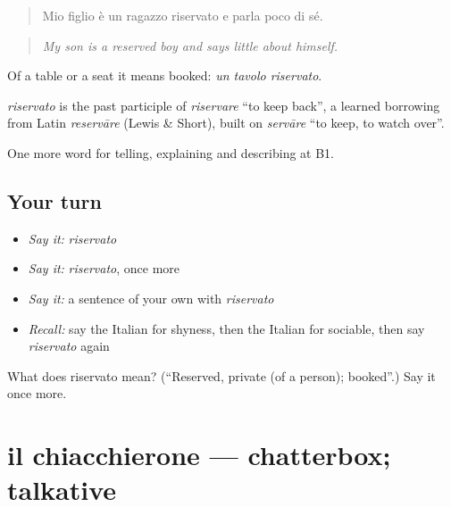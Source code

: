 \begin{quote}
Mio figlio è un ragazzo riservato e parla poco di sé.
\end{quote}

\begin{quote}
\emph{My son is a reserved boy and says little about himself.}
\end{quote}

Of a table or a seat it means booked: \emph{un tavolo riservato}.

\begin{cousinweb}
\emph{riservato} is the past participle of \emph{riservare} \textquotedblleft{}to keep back\textquotedblright{}, a learned borrowing from Latin \emph{reservāre} (Lewis \& Short), built on \emph{servāre} \textquotedblleft{}to keep, to watch over\textquotedblright{}.
\end{cousinweb}

\begin{grammarlens}[title={What you've built}]
One more word for telling, explaining and describing at B1.
\end{grammarlens}

\subsection*{Your turn}
\begin{itemize}
\raggedright
  \item \emph{Say it:} \emph{riservato}
  \item \emph{Say it:} \emph{riservato}, once more
  \item \emph{Say it:} a sentence of your own with \emph{riservato}
  \item \emph{Recall:} say the Italian for shyness, then the Italian for sociable, then say \emph{riservato} again
\end{itemize}

\begin{tcolorbox}[breakable,colback=teal!4,colframe=teal!35!black,title={Before you move on}]
What does riservato mean? (\textquotedblleft{}Reserved, private (of a person); booked\textquotedblright{}.) Say it once more.
\end{tcolorbox}
\section[il chiacchierone]{il chiacchierone — chatterbox; talkative}

\label{lesson:IT-C471-chiacchierone}



